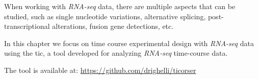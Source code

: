 When working with \textit{RNA-seq} data, there are multiple aspects that can be studied, such as single nucleotide variations, alternative splicing, post-transcriptional alterations, fusion gene detections, etc.


In this chapter we focus on time course experimental design with \textit{RNA-seq} data using the \gls{tic}, a tool developed for analyzing \textit{RNA-seq} time-course data.

The tool is available at: \url{https://github.com/drighelli/ticorser}
